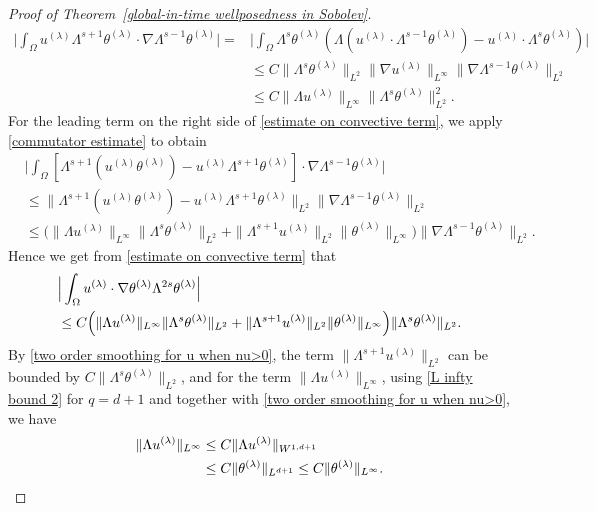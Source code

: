 \documentclass[reqno]{amsart}%
\theoremstyle{definition}
\theoremstyle{remark}
\numberwithin{equation}{section}
\newcommand{\thetalambda}{\theta^{(\lambda)}}
\newcommand{\1}{\mathbf{1}}
\numberwithin{equation}{section}
\numberwithin{theorem}{section}
\numberwithin{figure}{section}
\begin{document}
\begin{proof}[Proof of Theorem~\ref{global-in-time wellposedness in Sobolev}]
\begin{align*}
\Big|\int_{\Omega}u^{(\lambda)}\Lambda^{s+1}\theta^{(\lambda)}\cdot\nabla\Lambda^{s-1}\theta^{(\lambda)}\Big|=&\Big|\int_{\Omega}\Lambda^{s}\theta^{(\lambda)}(\Lambda(u^{(\lambda)}\cdot\Lambda^{s-1}\theta^{(\lambda)})-u^{(\lambda)}\cdot\Lambda^{s}\theta^{(\lambda)})\Big|\\
&\le C\|\Lambda^{s}\theta^{(\lambda)}\|_{L^2}\|\nabla u^{(\lambda)}\|_{L^\infty}\|\nabla\Lambda^{s-1}\theta^{(\lambda)}\|_{L^2}\\
&\le C\|\Lambda u^{(\lambda)}\|_{L^\infty}\|\Lambda^{s}\theta^{(\lambda)}\|^2_{L^2}.
\end{align*}
For the leading term on the right side of \eqref{estimate on convective term}, we apply \eqref{commutator estimate} to obtain
\begin{align*}
&\Big|\int_{\Omega}[\Lambda^{s+1}(u^{(\lambda)}\theta^{(\lambda)})-u^{(\lambda)}\Lambda^{s+1}\theta^{(\lambda)}]\cdot\nabla\Lambda^{s-1}\theta^{(\lambda)}\Big|\\
&\le \|\Lambda^{s+1}(u^{(\lambda)}\theta^{(\lambda)})-u^{(\lambda)}\Lambda^{s+1}\theta^{(\lambda)}\|_{L^2}\|\nabla\Lambda^{s-1}\theta^{(\lambda)}\|_{L^2}\\
&\le\Big(\|\Lambda u^{(\lambda)}\|_{L^\infty}\|\Lambda^{s}\theta^{(\lambda)}\|_{L^2}+\|\Lambda^{s+1}u^{(\lambda)}\|_{L^2}\|\theta^{(\lambda)}\|_{L^\infty}\Big)\|\nabla\Lambda^{s-1}\theta^{(\lambda)}\|_{L^2}.
\end{align*}
Hence we get from \eqref{estimate on convective term} that 
\begin{align}\label{estimate on convective term step 2}
&\Big|\int_{\Omega}u^{(\lambda)}\cdot\nabla\theta^{(\lambda)}\Lambda^{2s}\theta^{(\lambda)}\Big|\notag\\
&\le C\Big(\|\Lambda u^{(\lambda)}\|_{L^\infty}\|\Lambda^{s}\theta^{(\lambda)}\|_{L^2}+\|\Lambda^{s+1}u^{(\lambda)}\|_{L^2}\|\theta^{(\lambda)}\|_{L^\infty}\Big)\|\Lambda^{s}\theta^{(\lambda)}\|_{L^2}.
\end{align}
By \eqref{two order smoothing for u when nu>0}, the term $\|\Lambda^{s+1}u^{(\lambda)}\|_{L^2}$ can be bounded by $C\|\Lambda^{s}\theta^{(\lambda)}\|_{L^2}$, and for the term $\|\Lambda u^{(\lambda)}\|_{L^\infty}$, using \eqref{L infty bound 2} for $q=d+1$ and together with \eqref{two order smoothing for u when nu>0}, we have
\begin{align}\label{L infty bound on nabla u}
\|\Lambda u^{(\lambda)}\|_{L^\infty}&\le C\|\Lambda u^{(\lambda)}\|_{W^{1,d+1}}\notag\\
&\le C\|\theta^{(\lambda)}\|_{L^{d+1}}\le C\|\thetalambda\|_{L^\infty}.

\end{align}
\end{proof}
\end{document}
